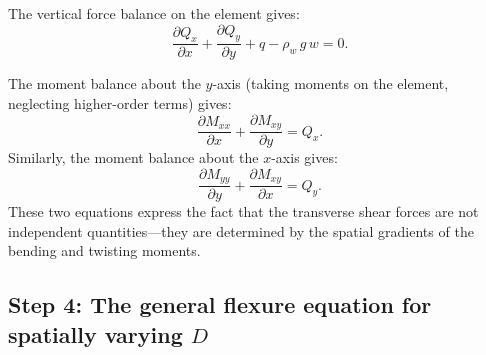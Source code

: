 \documentclass[11pt]{article}
\begin{document}
\noindent The vertical force balance on the element gives:
\begin{equation}
  \frac{\partial Q_x}{\partial x} + \frac{\partial Q_y}{\partial y} + q - \rho_w\,g\,w = 0.
  \label{eq:vertical_balance}
\end{equation}

\noindent The moment balance about the $y$-axis (taking moments on the element, neglecting higher-order terms) gives:
\begin{equation}
  \frac{\partial M_{xx}}{\partial x} + \frac{\partial M_{xy}}{\partial y} = Q_x.
  \label{eq:moment_balance_x}
\end{equation}
Similarly, the moment balance about the $x$-axis gives:
\begin{equation}
  \frac{\partial M_{yy}}{\partial y} + \frac{\partial M_{xy}}{\partial x} = Q_y.
  \label{eq:moment_balance_y}
\end{equation}
These two equations express the fact that the transverse shear forces are not independent quantities---they are determined by the spatial gradients of the bending and twisting moments.

\subsection*{Step 4: The general flexure equation for spatially varying $D$}
\end{document}

